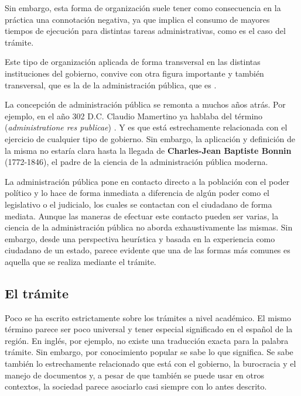 Sin embargo, esta forma de organización suele tener como consecuencia en la práctica una connotación negativa, 
ya que implica el consumo de mayores tiempos de ejecución para distintas tareas administrativas, como es el caso del trámite.

Este tipo de organización aplicada de forma transversal en las distintas instituciones del gobierno,
convive con otra figura importante y también transversal, que es la de la administración pública,
que es  \cite{guerreroCharlesJeanBonninSiglo2020}.

La concepción de administración pública se remonta a muchos años atrás. 
Por ejemplo, en el año 302 D.C. Claudio Mamertino ya hablaba del término  (\textit{administratione res publicae}) \cite{nixonPraiseLaterRoman1994}. 
Y es que está estrechamente relacionada con el ejercicio de cualquier tipo de gobierno. 
Sin embargo, la aplicación y definición de la misma no estaría clara hasta la llegada de \textbf{Charles-Jean Baptiste Bonnin} (1772-1846), 
el padre de la ciencia de la administración pública moderna.

La administración pública pone en contacto directo a la población con el poder político \cite{mostajomachicadoDerechoAdministrativoAdministracion2016} 
y lo hace de forma inmediata a diferencia de algún poder como el legislativo o el judicialo, los cuales se contactan con el ciudadano de forma mediata. 
Aunque las maneras de efectuar este contacto pueden ser varias, la ciencia de la administración pública no aborda exhaustivamente las mismas. 
Sin embargo, desde una perspectiva heurística y basada en la experiencia como ciudadano de un estado, parece evidente que una de las formas más comunes es aquella que se realiza mediante el trámite.

\subsection{El trámite}

Poco se ha escrito estrictamente sobre los trámites a nivel académico. 
El mismo término parece ser poco universal y tener especial significado en el español de la región. 
En inglés, por ejemplo, no existe una traducción exacta para la palabra trámite. 
Sin embargo, por conocimiento popular se sabe lo que significa. 
Se sabe también lo estrechamente relacionado que está con el gobierno, la burocracia y el manejo de documentos y, 
a pesar de que también se puede usar en otros contextos, la sociedad parece asociarlo casi siempre con lo antes descrito.

